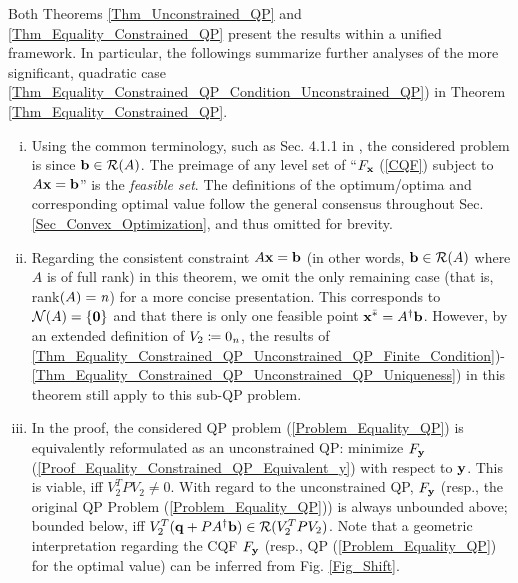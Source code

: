 \documentclass{imaman}
\newcommand{\bfb}{{\bf b}}
\newcommand{\bfx}{{\bf x}}
\newcommand{\bfq}{{\bf q}}
\newcommand{\bfy}{{\bf y}}
\newcommand{\bfzero}{{\bf 0}}
\newcommand{\calN}{{\mathcal N}}
\newcommand{\calR}{{\mathcal R}}
\newcommand{\itn}{{\it n}}
\numberwithin{equation}{section}
\begin{document}
\begin{remark}
Both Theorems \ref{Thm_Unconstrained_QP} and \ref{Thm_Equality_Constrained_QP} present the results within a unified framework. In particular, the followings summarize further analyses of the more significant, quadratic case \ref{Thm_Equality_Constrained_QP_Condition_Unconstrained_QP}) in Theorem \ref{Thm_Equality_Constrained_QP}.
\begin{enumerate}[i)]
\item Using the common terminology, such as Sec. 4.1.1 in \cite{BoVa:04}, the considered problem is  since $\bfb\in\calR(A)$. The preimage of any level set of ``$F_\bfx$ (\ref{CQF}) subject to $A\bfx=\bfb$'' is the \textit{feasible set}. The definitions of the optimum/optima and corresponding optimal value follow the general consensus \cite{BoVa:04} throughout Sec. \ref{Sec_Convex_Optimization}, and thus omitted for brevity.
\item\label{Rem_Thm_Equality_Constrained_QP_Vertex} Regarding the consistent constraint $A\bfx=\bfb$ (in other words, $\bfb\in\calR(A)$ where $A$ is of full rank) in this theorem, we omit the only remaining case (that is, rank$(A)=\itn$) for a more concise presentation. This corresponds to $\calN(A)=\{\bfzero\}$ and that there is only one feasible point $\bfx^{\bar *}=A^\dagger\bfb$. However, by an extended definition of $V_2\coloneqq 0_\itn$, the results of \ref{Thm_Equality_Constrained_QP_Unconstrained_QP_Finite_Condition})-\ref{Thm_Equality_Constrained_QP_Unconstrained_QP_Uniqueness}) in this theorem still apply to this sub-QP problem.
\item\label{Rem_Thm_Equality_Constrained_QP_Boundedness} In the proof, the considered QP problem (\ref{Problem_Equality_QP}) is equivalently reformulated as an unconstrained QP: minimize $F_\bfy$ (\ref{Proof_Equality_Constrained_QP_Equivalent_y}) with respect to $\bfy$. This is viable, iff $V_2^TPV_2\ne 0$. With regard to the unconstrained QP, $F_\bfy$ (resp., the original QP Problem (\ref{Problem_Equality_QP})) is always unbounded above; bounded below, iff $V_2^T(\bfq+PA^\dagger\bfb)\in\calR(V_2^TPV_2)$. Note that a geometric interpretation regarding the CQF $F_\bfy$ (resp., QP (\ref{Problem_Equality_QP}) for the optimal value) can be inferred from Fig. \ref{Fig_Shift}.
\end{enumerate}
\label{Rem_Thm_Equality_Constrained_QP}
\end{remark}
\end{document}

